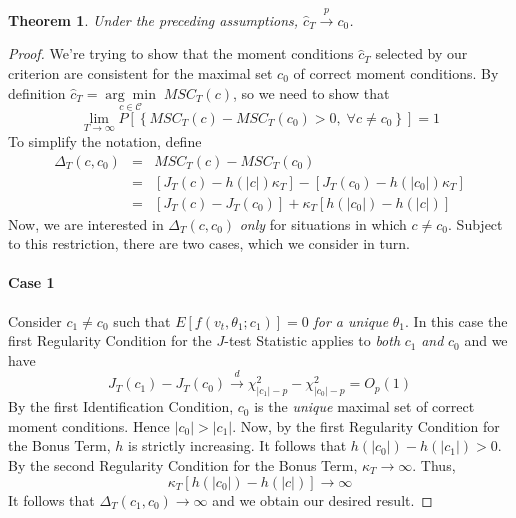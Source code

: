 \documentclass[12pt]{article}
\newtheorem{thm}{Theorem}[section]
\theoremstyle{definition}
\begin{document}
\begin{thm}
	Under the preceding assumptions, $\widehat{c}_T \overset{p}{\rightarrow} c_0$.
\end{thm}
\begin{proof}
We're trying to show that the moment conditions $\widehat{c}_T$ selected by our criterion are consistent for the maximal set $c_0$ of correct moment conditions. By definition $\widehat{c}_T = \underset{c\in \mathcal{C}}{\arg \min} \; MSC_T(c)$, so we need to show that
	$$\lim_{T\rightarrow \infty} P\left[\left\{MSC_T(c) - MSC_T(c_0)>0, \; \forall c \neq c_0\right\} \right] = 1$$
To simplify the notation, define
	\begin{eqnarray*}
		\Delta_T(c, c_0) &=& MSC_T(c) - MSC_T(c_0)\\
						&=& \left[J_T(c) -h(|c|)\kappa_T \right] - \left[J_T(c_0) -h(|c_0|)\kappa_T \right]\\
						&=& \left[J_T(c) - J_T(c_0)\right] + \kappa_T \left[h(|c_0|) - h(|c|) \right]
	\end{eqnarray*}
Now, we are interested in $\Delta_T(c, c_0)$ \emph{only} for situations in which $c\neq c_0$. Subject to this restriction, there are two cases, which we consider in turn. 
\paragraph{Case 1} Consider $c_1\neq c_0$ such that $E[f(v_t, \theta_1;c_1)]=0$ \emph{for a unique} $\theta_1$. In this case the first Regularity Condition for the $J$-test Statistic applies to \emph{both} $c_1$ \emph{and} $c_0$ and we have 
	$$J_T(c_1) - J_T(c_0) \overset{d}{\rightarrow} \chi^2_{|c_1| - p} - \chi^2_{|c_0|-p} = O_p(1)$$
By the first Identification Condition, $c_0$ is the \emph{unique} maximal set of correct moment conditions. Hence $|c_0| > |c_1|$. Now, by the first Regularity Condition for the Bonus Term, $h$ is strictly increasing. It follows that $h(|c_0|) - h(|c_1|)>0$. By the second Regularity Condition for the Bonus Term, $\kappa_T \rightarrow \infty$. Thus, 
	$$\kappa_T \left[h(|c_0|) - h(|c|) \right] \rightarrow \infty$$ 
It follows that $\Delta_T(c_1, c_0) \rightarrow \infty$ and we obtain our desired result.



\end{proof}
\end{document}
